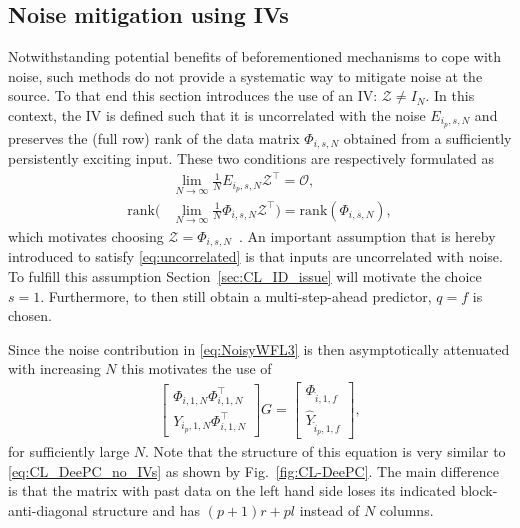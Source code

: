 \subsection{Noise mitigation using \acl{IVs}}
Notwithstanding potential benefits of beforementioned mechanisms to cope with noise, such methods do not provide a systematic way to mitigate noise at the source. To that end this section introduces the use of an \ac{IV}: $\mathcal{Z}\neq I_N$. In this context, the \ac{IV} is defined such that it is uncorrelated with the noise $E_{i_p,s,N}$ and preserves the (full row) rank of the data matrix $\Phi_{i,s,N}$ obtained from a sufficiently persistently exciting input. These two conditions are respectively formulated as
%
\begin{align}
    &\lim_{N\rightarrow\infty} \frac{1}{N}E_{i_p,s,N}\mathcal{Z}^\top = \mathcal{O},\label{eq:uncorrelated}\\
    \text{rank}\biggl(&\lim_{N\rightarrow\infty} \frac{1}{N}\Phi_{i,s,N}\mathcal{Z}^\top\biggl) =  \text{rank}(\Phi_{i,s,N}),\label{eq:rankconservation}
\end{align}
%
which motivates choosing $\mathcal{Z}=\Phi_{i,s,N}$~\cite[Chapt. 9.6]{Verhaegen2007a}. An important assumption that is hereby introduced to satisfy \eqref{eq:uncorrelated} is that inputs are uncorrelated with noise. To fulfill this assumption Section~\ref{sec:CL_ID_issue} will motivate the choice $s=1$. Furthermore, to then still obtain a multi-step-ahead predictor, $q=f$ is chosen.

Since the noise contribution in \eqref{eq:NoisyWFL3} is then asymptotically attenuated with increasing $N$ this motivates the use of
\begin{align}\label{eq:CL_DeePC_with_IV}
    \begin{bmatrix}
   \Phi_{i,1,N}\Phi_{i,1,N}^\top\\
   \hline
   Y_{i_p,1,N}\Phi_{i,1,N}^\top
    \end{bmatrix}
G =
\begin{bmatrix}
    \Phi_{\hat{i},1,f}\\
    \hline
    \widehat{Y}_{\hat{i}_p,1,f}
\end{bmatrix},
\end{align}
for sufficiently large $N$. Note that the structure of this equation is very similar to \eqref{eq:CL_DeePC_no_IVs} as shown by Fig.~\ref{fig:CL-DeePC}. The main difference is that the matrix with past data on the left hand side loses its indicated block-anti-diagonal structure and has $(p+1)r+pl$ instead of $N$ columns.

